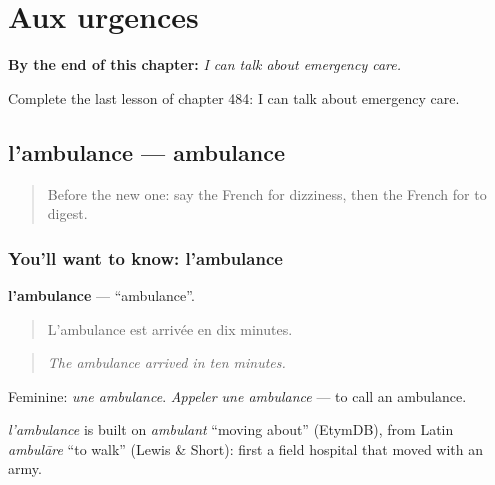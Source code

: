
\chapter{Aux urgences}
\label{ch:fr-aux-urgences}

\begin{chapteropening}
\textbf{By the end of this chapter:} \emph{I can talk about emergency care.}

Complete the last lesson of chapter 484: I can talk about emergency care.
\end{chapteropening}

\section[l'ambulance]{l'ambulance — ambulance}

\label{lesson:FR-C484-ambulance}



\begin{quote}
Before the new one: say the French for dizziness, then the French for to digest.
\end{quote}

\subsection*{You'll want to know: l'ambulance}
\textbf{l'ambulance} — \textquotedblleft{}ambulance\textquotedblright{}.

\begin{quote}
L'ambulance est arrivée en dix minutes.
\end{quote}

\begin{quote}
\emph{The ambulance arrived in ten minutes.}
\end{quote}

Feminine: \emph{une ambulance}. \emph{Appeler une ambulance} — to call an ambulance.

\begin{cousinweb}
\emph{l'ambulance} is built on \emph{ambulant} \textquotedblleft{}moving about\textquotedblright{} (EtymDB), from Latin \emph{ambulāre} \textquotedblleft{}to walk\textquotedblright{} (Lewis \& Short): first a field hospital that moved with an army.
\end{cousinweb}

